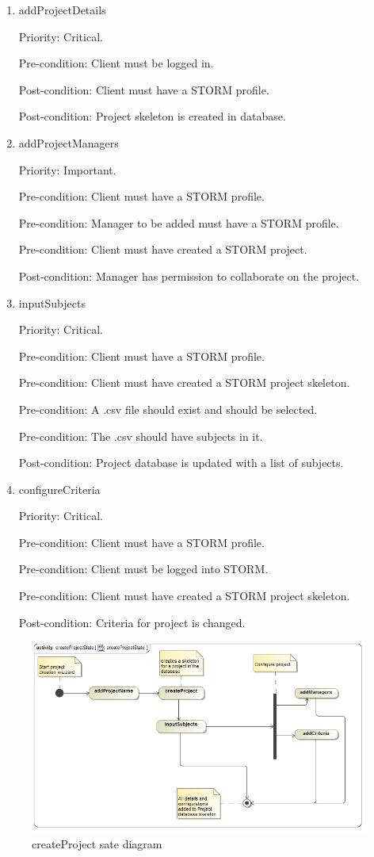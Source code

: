 \begin{enumerate}
\item addProjectDetails\par
Priority: Critical.\par
Pre-condition: Client must be logged in.\par
Post-condition: Client must have a STORM profile.\par
Post-condition: Project skeleton is created in database.\par
\item addProjectManagers\par
Priority: Important.\par
Pre-condition: Client must have a STORM profile.\par
Pre-condition: Manager to be added must have a STORM profile.\par
Pre-condition: Client must have created a STORM project.\par
Post-condition: Manager has permission to collaborate on the project.\par
\item inputSubjects\par
Priority: Critical.\par
Pre-condition: Client must have a STORM profile.\par
Pre-condition: Client must have created a STORM project skeleton.\par
Pre-condition: A .csv file should exist and should be selected.\par
Pre-condition: The .csv should have subjects in it.\par
Post-condition: Project database is updated with a list of subjects.\par
\item configureCriteria\par
Priority: Critical.\par
Pre-condition: Client must have a STORM profile.\par
Pre-condition: Client must be logged into STORM.\par
Pre-condition: Client must have created a STORM project skeleton.\par
Post-condition: Criteria for project is changed.\par
\end{enumerate}
\begin{figure}[h]
    \centering
    \includegraphics[width=15cm]{./graphics/createProjectState.jpg}
    \caption{createProject sate diagram}
    \label{fig:createProject_state}
\end{figure}